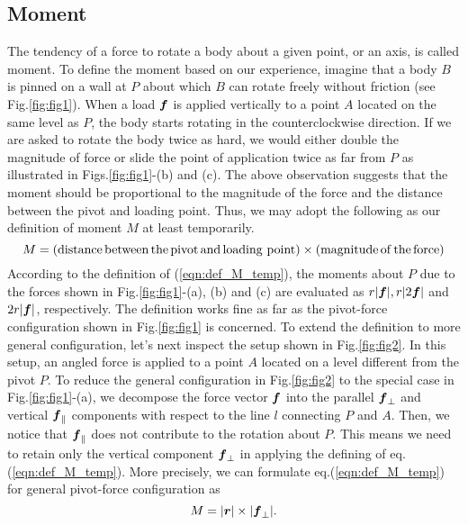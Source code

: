 \documentclass[10pt,a4j]{article}
\begin{document}
\subsection{Moment}
The tendency of a force to rotate a body about a given point, or an axis, 
is called moment. To define the moment based on our experience, 
imagine that a body $B$ is pinned on a wall at $P$ about which $B$ 
can rotate freely without friction (see Fig.\ref{fig:fig1}). 
When a load $\mbox{\boldmath $f$}$ is applied vertically to a point $A$ located on the same 
level as $P$, the body starts rotating in the counterclockwise direction. 
 If we are asked to rotate the body twice as hard, we would either double 
 the magnitude of force or slide the point of application twice as far from $P$ 
 as illustrated in Figs.\ref{fig:fig1}-(b) and (c). 
The above observation suggests that the moment should be proportional to 
the magnitude of the force and the distance between the pivot and 
loading point. Thus, we may adopt the following as our definition of 
moment $M$ at least temporarily.
\begin{equation}
	M=({\rm distance \, between \,the \, pivot\, and\, loading\ point) \times (magnitude \, of \, the \,force)}
	\label{eqn:def_M_temp}
\end{equation}
According to the definition of (\ref{eqn:def_M_temp}), the moments about $P$ due 
to the forces shown in Fig.\ref{fig:fig1}-(a), (b) and (c) are evaluated as $r|\mbox{\boldmath $f$}|, r|2\mbox{\boldmath $f$}|$ 
and $2r|\mbox{\boldmath $f$}|$, respectively. The definition works fine as far as the pivot-force 
configuration shown in Fig.\ref{fig:fig1} is concerned.
To extend the definition to more general configuration, let's next inspect the setup 
shown in Fig.\ref{fig:fig2}. In this setup, an angled force is applied to a point $A$ 
located on a level different from the pivot $P$.
To reduce the general configuration in Fig.\ref{fig:fig2} to the special case 
in Fig.\ref{fig:fig1}-(a), we decompose the force vector $\mbox{\boldmath $f$}$ into the parallel 
$\mbox{\boldmath $f$}_{\perp}$ and vertical $\mbox{\boldmath $f$}_\parallel$ components with respect to the line $l$ 
connecting $P$ and $A$. Then, we notice that $\mbox{\boldmath $f$}_{\parallel}$ does not contribute to 
the rotation about $P$. This means we need to retain only the vertical component 
$\mbox{\boldmath $f$}_{\perp}$ in applying the defining of eq.(\ref{eqn:def_M_temp}). 
More precisely, we can formulate eq.(\ref{eqn:def_M_temp}) for general pivot-force 
configuration as 
\begin{equation}
	M=|\mbox{\boldmath $r$}|\times |\mbox{\boldmath $f$}_{\perp}|.
	\label{eqn:def_M_fp}
\end{equation}
\end{document}
